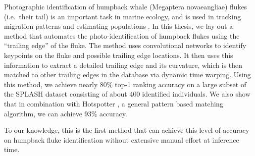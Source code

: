  

Photographic identification of humpback whale (Megaptera novaeangliae) flukes (i.e.\ their tail) is an important task in marine ecology, and is used in tracking migration patterns and estimating populations \cite{blackmer2000temporal, calambokidis2008splash}.
In this thesis, we lay out a method that automates the photo-identification of humpback flukes using the ``trailing edge'' of the fluke.
The method uses convolutional networks to identify keypoints on the fluke and possible trailing edge locations.
It then uses this information to extract a detailed trailing edge and its curvature, which is then matched to other trailing edges in the database via dynamic time warping.
Using this method, we achieve nearly 80\% top-1 ranking accuracy on a large subset of the SPLASH \cite{calambokidis2008splash} dataset consisting of about 400 identified individuals.
We also show that in combination with Hotspotter \cite{crall_hotspotter_2013}, a general pattern based matching algorithm, we can achieve 93\% accuracy.

To our knowledge, this is the first method that can achieve this level of accuracy on humpback fluke identification without extensive manual effort at inference time.





